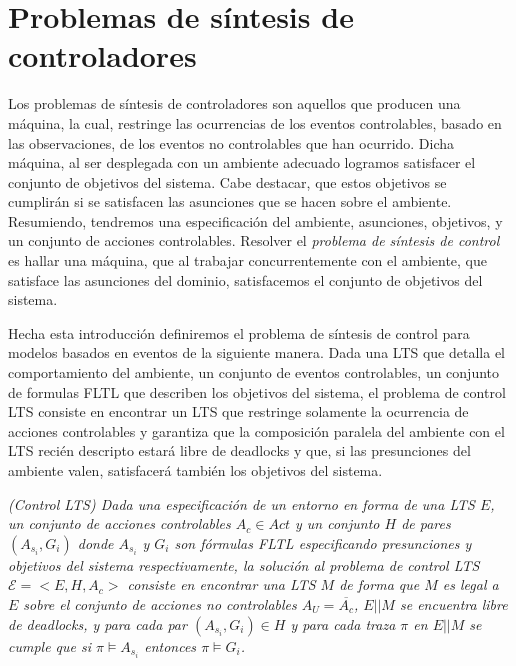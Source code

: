 \section{Problemas de síntesis de controladores}

Los problemas de síntesis de controladores son aquellos que producen una máquina, la cual, restringe las ocurrencias de
los eventos controlables, basado en las observaciones, de los eventos no controlables que han ocurrido. Dicha máquina, al
ser desplegada con un ambiente adecuado logramos satisfacer el conjunto de objetivos del sistema. Cabe destacar, que
estos objetivos se cumplirán si se satisfacen las asunciones que se hacen sobre el ambiente. Resumiendo, tendremos una
especificación del ambiente, asunciones, objetivos, y un conjunto de acciones controlables. Resolver el \emph{problema
de síntesis de control} es hallar una máquina, que al trabajar concurrentemente con el ambiente, que satisface las
asunciones del dominio, satisfacemos el conjunto de objetivos del sistema.

Hecha esta introducción definiremos el problema de síntesis de control para modelos basados en eventos de la siguiente
manera. Dada una LTS que detalla el comportamiento del ambiente, un conjunto de eventos controlables, un conjunto de
formulas FLTL que describen los objetivos del sistema, el problema de control LTS consiste en encontrar un LTS que
restringe solamente la ocurrencia de acciones controlables y garantiza que la composición paralela del ambiente con el
LTS recién descripto estará libre de deadlocks y que, si las presunciones del ambiente valen, satisfacerá también los
objetivos del sistema.

\begin{nahaDef}
    \label{LTS_control}
    \emph{(Control LTS) Dada una especificación de un entorno en forma de una LTS $E$, un conjunto de acciones
    controlables $A_c \in Act$ y un conjunto $H$ de pares $(A_{s_i}, G_i)$ donde $A_{s_i}$ y $G_i$ son fórmulas FLTL
    especificando presunciones y objetivos del sistema respectivamente, la solución al problema de control LTS
    $\mathcal{E} = <E,H,A_c>$ consiste en encontrar una LTS $M$ de forma que $M$ es legal a $E$ sobre el conjunto de acciones
    no controlables $A_U = \overline{A_c}$, $E||M$ se encuentra libre de deadlocks, y para cada par $(A_{s_i}, G_i) \in
    H$ y para cada traza $\pi$ en $E||M$ se cumple que si $\pi \vDash A_{s_i}$ entonces $\pi \vDash G_i$.}
\end{nahaDef}

